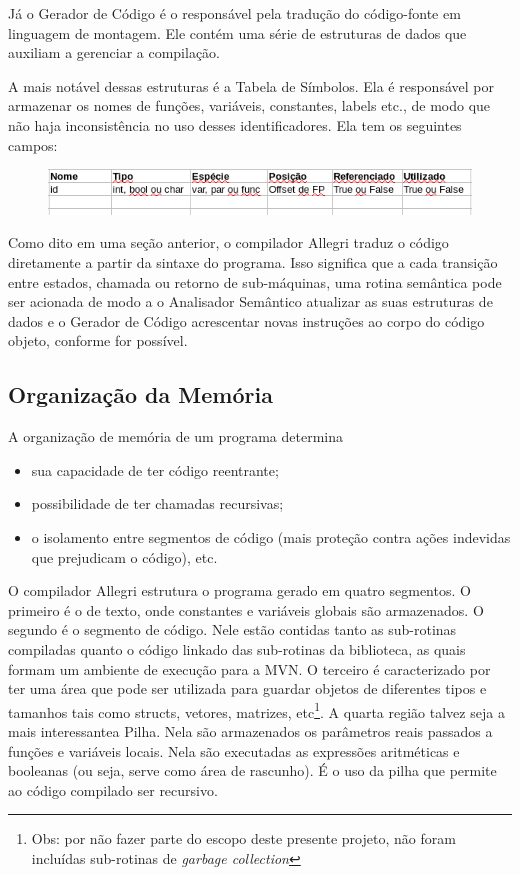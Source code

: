 \documentclass[a4paper,12pt]{report}
\begin{document}
    Já o Gerador de Código é o responsável pela tradução do código-fonte em linguagem de montagem. Ele contém uma série de estruturas de dados que auxiliam a gerenciar a compilação.

    A mais notável dessas estruturas é a Tabela de Símbolos. Ela é responsável por armazenar os nomes de funções, variáveis, constantes, labels etc., de modo que não haja inconsistência no uso desses identificadores. Ela tem os seguintes campos:
    \begin{figure}[h]
        \centering
        \includegraphics[scale=.75]{tabela_simbolos}
    \end{figure}

    Como dito em uma seção anterior, o compilador Allegri traduz o código diretamente a partir da sintaxe do programa. Isso significa que a cada transição entre estados, chamada ou retorno de sub-máquinas, uma rotina semântica pode ser acionada de modo a o Analisador Semântico atualizar as suas estruturas de dados e o Gerador de Código acrescentar novas instruções ao corpo do código objeto, conforme for possível.

    \subsection*{Organização da Memória}
    A organização de memória de um programa determina
    \begin{itemize}
        \item sua capacidade de ter código reentrante;
        \item possibilidade de ter chamadas recursivas;
        \item o isolamento entre segmentos de código (mais proteção contra ações indevidas que prejudicam o código), etc.
    \end{itemize}

    O compilador Allegri estrutura o programa gerado em quatro segmentos. O primeiro é o de texto, onde constantes e variáveis globais são armazenados. O segundo é o segmento de código. Nele estão contidas tanto as sub-rotinas compiladas quanto o código linkado das sub-rotinas da biblioteca, as quais formam um ambiente de execução para a MVN. O terceiro é caracterizado por ter uma área que pode ser utilizada para guardar objetos de diferentes tipos e tamanhos tais como structs, vetores, matrizes, etc\footnote{Obs: por não fazer parte do escopo deste presente projeto, não foram incluídas sub-rotinas de \textit{garbage collection}}. A quarta região talvez seja a mais interessante\textemdash a Pilha. Nela são armazenados os parâmetros reais passados a funções e variáveis locais. Nela são executadas as expressões aritméticas e booleanas (ou seja, serve como área de rascunho). É o uso da pilha que permite ao código compilado ser recursivo.
\end{document}
